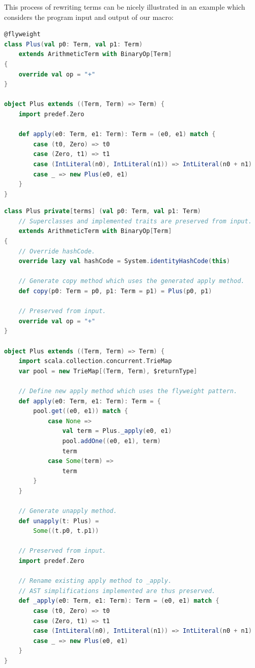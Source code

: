 \documentclass[11pt]{article}
\begin{document}
    This process of rewriting terms can be nicely illustrated in an example
    which considers the program input and output of our macro:

    \begin{lstlisting}[language=Scala, caption={Input code given to the macro.}, label={lst:macro-input}]
@flyweight
class Plus(val p0: Term, val p1: Term)
    extends ArithmeticTerm with BinaryOp[Term]
{
    override val op = "+"
}

object Plus extends ((Term, Term) => Term) {
    import predef.Zero

    def apply(e0: Term, e1: Term): Term = (e0, e1) match {
        case (t0, Zero) => t0
        case (Zero, t1) => t1
        case (IntLiteral(n0), IntLiteral(n1)) => IntLiteral(n0 + n1)
        case _ => new Plus(e0, e1)
    }
}        
    \end{lstlisting}

    \begin{lstlisting}[language=Scala, caption={Output code generated by our macro.}, label={lst:macro-output}]
class Plus private[terms] (val p0: Term, val p1: Term)
    // Superclasses and implemented traits are preserved from input.
    extends ArithmeticTerm with BinaryOp[Term]
{
    // Override hashCode.
    override lazy val hashCode = System.identityHashCode(this)

    // Generate copy method which uses the generated apply method.
    def copy(p0: Term = p0, p1: Term = p1) = Plus(p0, p1)

    // Preserved from input.
    override val op = "+"
}

object Plus extends ((Term, Term) => Term) {
    import scala.collection.concurrent.TrieMap
    var pool = new TrieMap[(Term, Term), $returnType]

    // Define new apply method which uses the flyweight pattern.
    def apply(e0: Term, e1: Term): Term = {
        pool.get((e0, e1)) match {
            case None => 
                val term = Plus._apply(e0, e1)
                pool.addOne((e0, e1), term)
                term
            case Some(term) => 
                term
        }
    }

    // Generate unapply method.
    def unapply(t: Plus) =
        Some((t.p0, t.p1))

    // Preserved from input.
    import predef.Zero

    // Rename existing apply method to _apply.
    // AST simplifications implemented are thus preserved.
    def _apply(e0: Term, e1: Term): Term = (e0, e1) match {
        case (t0, Zero) => t0
        case (Zero, t1) => t1
        case (IntLiteral(n0), IntLiteral(n1)) => IntLiteral(n0 + n1)
        case _ => new Plus(e0, e1)
    }
}       
    \end{lstlisting}
\end{document}
